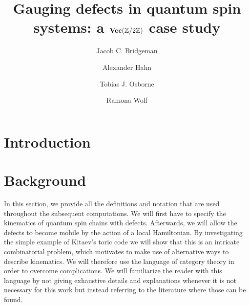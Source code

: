 




\title{Gauging defects in quantum spin systems: a $\textbf{Vec}(\mathbb{Z}/2\mathbb{Z})$ case study}


\author{Jacob C. Bridgeman}
\author{Alexander Hahn}
\author{Tobias J. Osborne}
\author{Ramona Wolf}

                            

\begin{abstract}

\end{abstract}


\maketitle

\section{Introduction}


\section{Background}\label{S:defs}
In this section, we provide all the definitions and notation that are used throughout the subsequent computations. We will first have to specify the kinematics of quantum spin chains with defects. Afterwards, we will allow the defects to become mobile by the action of a local Hamiltonian. By investigating the simple example of Kitaev's toric code \cite{Kit03} we will show that this is an intricate combinatorial problem, which motivates to make use of alternative ways to describe kinematics. We will therefore use the language of category theory in order to overcome complications. We will familiarize the reader with this language by not giving exhaustive details and explanations whenever it is not necessary for this work but instead referring to the literature where those can be found.

